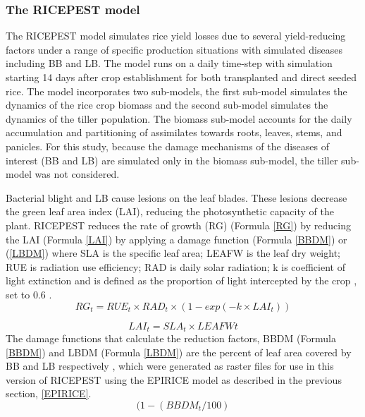     \subsubsection{The RICEPEST model}\label{RICEPEST}
    The RICEPEST model \citep{Willocquet2000,Willocquet2002} simulates rice yield losses due to several yield-reducing factors under a range of specific production situations with simulated diseases including BB and LB. The model runs on a daily time-step with simulation starting 14 days after crop establishment for both transplanted and direct seeded rice. The model incorporates two sub-models, the first sub-model simulates the dynamics of the rice crop biomass and the second sub-model simulates the dynamics of the tiller population. The biomass sub-model accounts for the daily accumulation and partitioning of assimilates towards roots, leaves, stems, and panicles. For this study, because the damage mechanisms of the diseases of interest (BB and LB) are simulated only in the biomass sub-model, the tiller sub-model was not considered.
    
    Bacterial blight and LB cause lesions on the leaf blades. These lesions decrease the green leaf area index (LAI), reducing the photosynthetic capacity of the plant. RICEPEST reduces the rate of growth (RG) (Formula \ref{RG}) by reducing the LAI (Formula \ref{LAI}) by applying a damage function (Formula \ref{BBDM}) or (\ref{LBDM}) where SLA is the specific leaf area; LEAFW is the leaf dry weight; RUE is radiation use efficiency; RAD is daily solar radiation; k is coefficient of light extinction and is defined as the proportion of light intercepted by the crop \citep{Willocquet2000}, set to 0.6 \citep{Willocquet2002}.
    \begin{equation}
    RG_t = RUE_t \times RAD_t \times (1- exp(- k \times LAI_t))
    \label{RG}
    \end{equation}
    
    \begin{equation}
    LAI_t = SLA_t \times LEAFWt
    \label{LAI}
    \end{equation}
    The damage functions that calculate the reduction factors, BBDM (Formula \ref{BBDM}) and LBDM (Formula \ref{LBDM}) are the percent of leaf area covered by BB and LB respectively \citep{Willocquet2002}, which were generated as raster files for use in this version of RICEPEST using the EPIRICE model as described in the previous section, \ref{EPIRICE}. 
    \begin{equation}
    (1-(BBDM_t /100)
    \label{BBDM}
    \end{equation}
    
